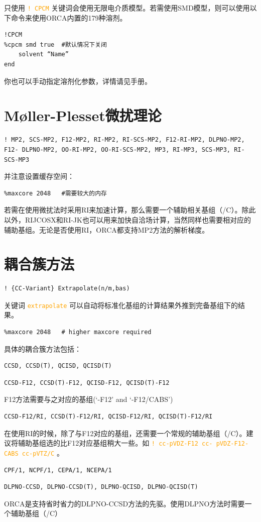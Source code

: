 \documentclass{ctexart}
\newcommand{\cmd}[1]{\textcolor{orange}{ \texttt{#1} }}
\begin{document}
	只使用\cmd{! CPCM}关键词会使用无限电介质模型。若需使用SMD模型，则可以使用以下命令来使用ORCA内置的179种溶剂。
	
	\begin{lstlisting}
!CPCM	
%cpcm smd true	#默认情况下关闭
	solvent “Name”
end
	\end{lstlisting}
	
	你也可以手动指定溶剂化参数，详情请见手册。
	
	\section{Møller-Plesset微扰理论} 
	\begin{lstlisting}
! MP2, SCS-MP2, F12-MP2, RI-MP2, RI-SCS-MP2, F12-RI-MP2, DLPNO-MP2, F12- DLPNO-MP2, OO-RI-MP2, OO-RI-SCS-MP2, MP3, RI-MP3, SCS-MP3, RI-SCS-MP3
	\end{lstlisting}
	
	并注意设置缓存空间：
	\begin{lstlisting}
%maxcore 2048	#需要较大的内存
	\end{lstlisting}
	
	若需在使用微扰法时采用RI来加速计算，那么需要一个辅助相关基组（/C）。除此以外，RIJCOSX和RI-JK也可以用来加快自洽场计算，当然同样也需要相对应的辅助基组。无论是否使用RI，ORCA都支持MP2方法的解析梯度。
	
	\section{耦合簇方法} 
	\begin{lstlisting}
! {CC-Variant} Extrapolate(n/m,bas)
	\end{lstlisting}
	
	关键词\cmd{extrapolate}可以自动将标准化基组的计算结果外推到完备基组下的结果。
	
	\begin{lstlisting}
%maxcore 2048	# higher maxcore required 
	\end{lstlisting}
	
	具体的耦合簇方法包括：
	\begin{lstlisting}
CCSD, CCSD(T), QCISD, QCISD(T)
	\end{lstlisting}
	
	\begin{lstlisting}
CCSD-F12, CCSD(T)-F12, QCISD-F12, QCISD(T)-F12
	\end{lstlisting}
	
	F12方法需要与之对应的基组(‘-F12’ and ‘-F12/CABS’)
	\begin{lstlisting}
CCSD-F12/RI, CCSD(T)-F12/RI, QCISD-F12/RI, QCISD(T)-F12/RI
	\end{lstlisting}
	在使用RI的时候，除了与F12对应的基组，还需要一个常规的辅助基组（/C）。建议将辅助基组选的比F12对应基组稍大一些。如\cmd{! cc-pVDZ-F12 cc- pVDZ-F12-CABS cc-pVTZ/C}。
	\begin{lstlisting}
CPF/1, NCPF/1, CEPA/1, NCEPA/1
	\end{lstlisting}
	\begin{lstlisting}
DLPNO-CCSD, DLPNO-CCSD(T), DLPNO-QCISD, DLPNO-QCISD(T)
	\end{lstlisting}
	ORCA是支持省时省力的DLPNO-CCSD方法的先驱。使用DLPNO方法时需要一个辅助基组（/C）
	
\end{document}
